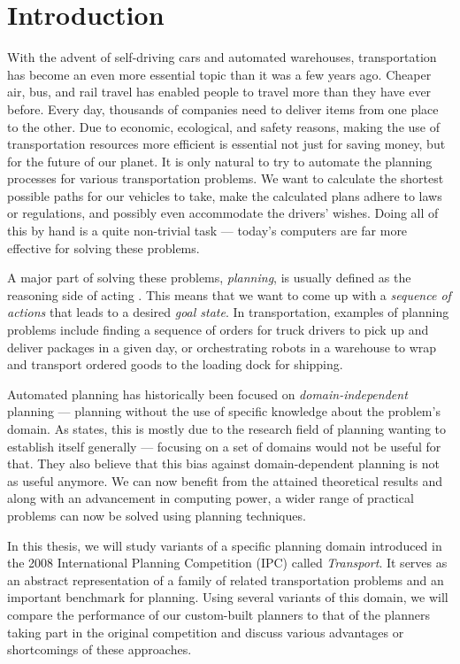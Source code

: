 \chapter*{Introduction}

With the advent of self-driving cars and automated warehouses, transportation has become an even more essential topic than it was a few years ago.
Cheaper air, bus, and rail travel has enabled people to travel more than they have ever before.
Every day, thousands of companies need to deliver items from
one place to the other. Due to economic, ecological, and safety reasons, making the use of transportation resources more efficient is essential not just for saving money,
but for the future of our planet.
It is only natural to try to automate the planning processes for various transportation problems.
We want to calculate the shortest possible paths for our vehicles to take,
make the calculated plans adhere to laws or regulations, and possibly even accommodate the drivers'
wishes. Doing all of this by hand is a quite non-trivial task --- today's computers
are far more effective for solving these problems.

A major part of solving these problems, \textit{planning}, is usually defined as the reasoning side of acting \citep[Section~1.1]{Ghallab2004}.
This means that we want to come up with a \textit{sequence of actions} that leads to a desired \textit{goal state}.
In transportation, examples of planning problems include finding a sequence of orders for truck drivers to pick up and deliver packages in a given day,
or orchestrating robots in a warehouse to wrap and transport ordered goods to the loading dock for shipping.

Automated planning has historically been focused on \textit{domain-independent} planning --- planning without
the use of specific knowledge about the problem's domain.
As \citet{Nau2007} states, this is mostly due to the research field of planning wanting to
establish itself generally --- focusing on a set of domains would not be useful for that.
They also believe that this bias against domain-dependent planning is not as useful anymore.
We can now benefit from the attained theoretical results and along with an advancement in computing power,
a wider range of practical problems can now be solved using planning techniques.

In this thesis, we will study variants of a specific planning domain introduced in the 2008 International Planning Competition (IPC) called \textit{Transport}. It serves as an abstract representation of a family of related transportation problems
and an important benchmark for planning. Using several variants
of this domain, we will compare the performance of our custom-built planners to that of the planners taking part in the original competition and discuss various advantages or shortcomings of these approaches.

